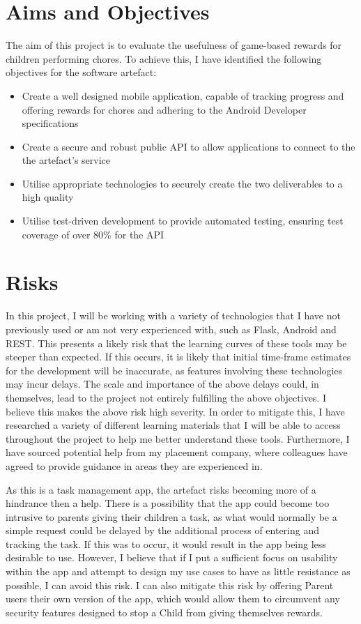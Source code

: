 \section{Aims and Objectives}
The aim of this project is to evaluate the usefulness of game-based rewards for children performing chores. 
To achieve this, I have identified the following objectives for the software artefact:

\begin{itemize}
	\item Create a well designed mobile application, capable of tracking progress and offering rewards for chores and adhering to the Android Developer specifications
	\item Create a secure and robust public API to allow applications to connect to the the artefact's service
	\item Utilise appropriate technologies to securely create the two deliverables to a high quality
	\item Utilise test-driven development to provide automated testing, ensuring test coverage of over 80\% for the API
\end{itemize}

\section{Risks}
In this project, I will be working with a variety of technologies that I have not previously used or am not very experienced with, such as Flask, Android and REST. 
This presents a likely risk that the learning curves of these tools may be steeper than expected.
If this occurs, it is likely that initial time-frame estimates for the development will be inaccurate, as features involving these technologies may incur delays.
The scale and importance of the above delays could, in themselves, lead to the project not entirely fulfilling the above objectives. I believe this makes the above risk high severity.
In order to mitigate this, I have researched a variety of different learning materials that I will be able to access throughout the project to help me better understand these tools.
Furthermore, I have sourced potential help from my placement company, where colleagues have agreed to provide guidance in areas they are experienced in.

As this is a task management app, the artefact risks becoming more of a hindrance then a help.
There is a possibility that the app could become too intrusive to parents giving their children a task, as what would normally be a simple request could be delayed by the additional process of entering and tracking the task.
If this was to occur, it would result in the app being less desirable to use.
However, I believe that if I put a sufficient focus on usability within the app and attempt to design my use cases to have as little resistance as possible, I can avoid this risk.
I can also mitigate this risk by offering Parent users their own version of the app, which would allow them to circumvent any security features designed to stop a Child from giving themselves rewards.